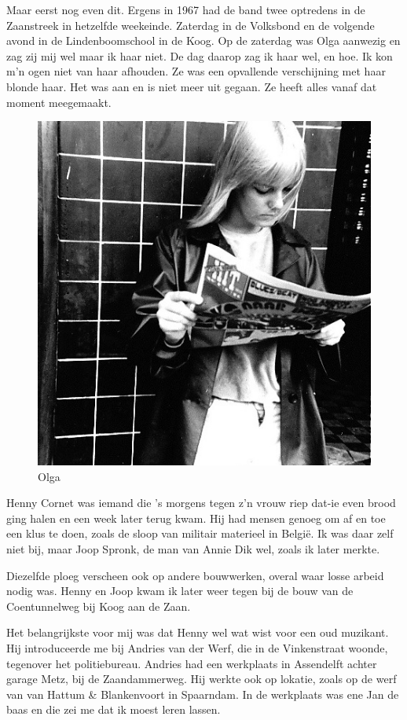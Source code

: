 \documentclass[12pt,twoside, openright]{memoir}
\begin{document}
Maar eerst nog even dit. Ergens in 1967 had de band twee optredens in de Zaanstreek in hetzelfde weekeinde. Zaterdag in de Volksbond en de volgende avond in de Lindenboomschool in de Koog. Op de zaterdag was Olga aanwezig en zag zij mij wel maar ik haar niet. De dag daarop zag ik haar wel, en hoe. Ik kon m'n ogen niet van haar afhouden. Ze was een opvallende verschijning met haar blonde haar. Het was aan en is niet meer uit gegaan. Ze heeft alles vanaf dat moment meegemaakt.

\begin{figure}
\centering
\includegraphics[width=\textwidth]{img/ch38/olga}
\caption*{\footnotesize Olga}
\end{figure}

Henny Cornet was iemand die ’s morgens tegen z’n vrouw riep dat-ie even brood ging halen en een week later terug kwam. Hij had mensen genoeg om af en toe een klus te doen, zoals de sloop van militair materieel in België. Ik was daar zelf niet bij, maar Joop Spronk, de man van Annie Dik wel, zoals ik later merkte. 

Diezelfde ploeg verscheen ook op andere bouwwerken, overal waar losse arbeid nodig was. Henny en Joop kwam ik later weer tegen bij de bouw van de Coentunnelweg bij Koog aan de Zaan. 

Het belangrijkste voor mij was dat Henny wel wat wist voor een oud muzikant. Hij introduceerde me bij Andries van der Werf, die in de Vinkenstraat woonde, tegenover het politiebureau. Andries had een werkplaats in Assendelft achter garage Metz, bij de Zaandammerweg. Hij werkte ook op lokatie, zoals op de werf van van Hattum \& Blankenvoort in Spaarndam. In de werkplaats was ene Jan de baas en die zei me dat ik moest leren lassen. 
\end{document}
